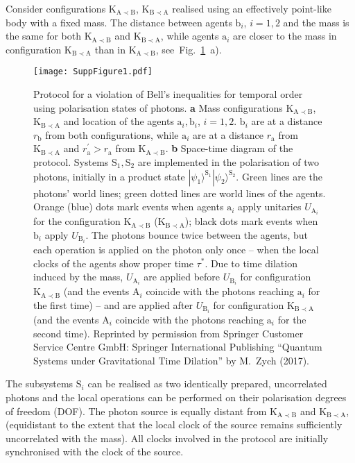 \documentclass[a4paper,11pt]{article}
\newcommand{\ket}{\rangle}
\begin{document}
Consider  configurations $\mathrm{K_{A\prec B}}$, $\mathrm{K_{B\prec A}}$ realised using an effectively point-like body with a fixed mass.
The distance between agents $\mathrm b_i$, $i=1,2$ and the mass is the same for both $\mathrm{K_{A\prec B}}$ and $\mathrm{K_{B\prec A}}$,  while agents $\mathrm a_i$ are closer to the mass in configuration $\mathrm{K_{B\prec A}}$ than in  $\mathrm{K_{A\prec B}}$, see~Fig.~\ref{implementationsBell}~a).
%
\begin{figure}[h!]
\begin{center}
\texttt{[image: SuppFigure1.pdf]}
\caption{Protocol for a violation of Bell's inequalities for temporal order using polarisation states of photons. \textbf{a} Mass configurations $\mathrm{K_{A\prec B}}$, $\mathrm{K_{B\prec A}}$ and location of the agents $\mathrm a_i, \mathrm b_i$, $i=1,2$. $\mathrm b_i$ are at a distance $r_\mathrm{b}$ from both %
{configurations}, while $\mathrm a_i$ are at a distance $r_\mathrm{a}$  from $\mathrm{K_{B\prec A}}$ and $r_\mathrm{a}^\prime>r_\mathrm{a}$ from $\mathrm{K_{A\prec B}}$. \textbf{b} Space-time diagram of the protocol. Systems $\mathrm{S_1, S_2}$ are implemented in the polarisation of two photons, initially in a product state $|\psi_1\ket^\mathrm{S_1}|\psi_2\ket^\mathrm{S_2}$. Green lines are the photons' world lines;  green dotted lines are world lines of the agents. Orange (blue) dots mark events when agents $\mathrm a_i$ apply unitaries $U_{\mathrm A_i}$ for the configuration $\mathrm{K_{A\prec B}}$ ($\mathrm{K_{B\prec A}}$); black dots mark events when $\mathrm b_i$ apply $U_{\mathrm B_i}$. {The photons bounce twice between the agents, but each operation is applied on the photon only once -- when the local clocks of the agents show proper time $\tau^*$. Due to time dilation induced by the mass, $U_{\mathrm A_i}$ are applied before $U_{\mathrm B_i}$ for configuration $\mathrm{K_{A\prec B}}$ (and the events $\mathrm A_i$ coincide with the photons reaching $\mathrm a_i$ for the first time) -- and are applied after $U_{\mathrm B_i}$ for configuration $\mathrm{K_{B\prec A}}$ (and the events $\mathrm A_i$ coincide with the photons reaching $\mathrm a_i$ for the second time). Reprinted
by permission from Springer Customer Service Centre GmbH: Springer International Publishing ``Quantum
Systems under Gravitational Time Dilation'' by M.~Zych (2017).} \hspace*{\fill}}
\label{implementationsBell}
\end{center}
\end{figure}
%
The subsystems  $\mathrm S_i$ can be realised as two identically prepared, uncorrelated photons and the local operations can be performed on their polarisation degrees of freedom (DOF). The photon source is equally distant from $\mathrm{K_{A\prec B}}$ and $\mathrm{K_{B\prec A}}$, (equidistant to the extent that the local clock of  the source remains sufficiently uncorrelated with the mass). All clocks involved in the protocol are initially synchronised with the clock of the source.
\end{document}
